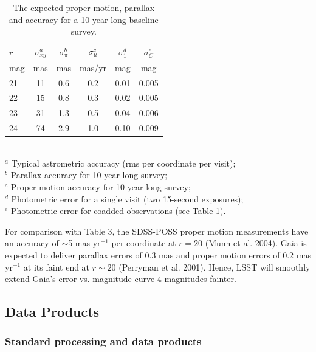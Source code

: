 \documentclass{emulateapj}
\begin{document}
\begin{table}
\caption{The expected proper motion, parallax and accuracy for a 10-year long baseline survey.}
\begin{tabular}{|l|c|c|c|c|c|}
\hline  
    $r$   &  $\sigma^a_{xy} $  & $\sigma^b_\pi$  &   $\sigma^c_\mu$   &  $\sigma^d_1$  &  $\sigma^e_C$  \\
    mag &       mas            &      mas  & mas/yr &   mag   &    mag  \\
\hline  
       21 &  11  &  0.6  &  0.2   &   0.01  &   0.005 \\
       22 &  15  &  0.8  &  0.3   &   0.02  &   0.005 \\
       23 &  31  &  1.3  &  0.5   &   0.04  &   0.006 \\
       24 &  74  &  2.9  &  1.0   &   0.10  &   0.009 \\
\hline                         
\end{tabular}
\\ \vskip 0.05in
  $^a$ Typical astrometric accuracy (rms per coordinate per visit); \\
  $^b$ Parallax accuracy for 10-year long survey; \\
  $^c$ Proper motion accuracy for 10-year long survey; \\
  $^d$ Photometric error for a single visit (two 15-second exposures); \\
  $^e$ Photometric error for coadded observations (see Table 1). \\
\end{table}



For comparison with Table 3, the SDSS-POSS proper motion measurements have an 
accuracy of $\sim$5 mas yr$^{-1}$ per coordinate at $r=20$ (Munn et al. 2004). Gaia
is expected to deliver parallax errors of 0.3 mas and proper motion errors of 
0.2 mas yr$^{-1}$ at its faint end at $r\sim20$ (Perryman et al. 2001). Hence, LSST will smoothly 
extend Gaia's error vs. magnitude curve 4 magnitudes fainter.



\subsection{             Data Products                    } 

\subsubsection{ Standard processing and data products}
\end{document}
